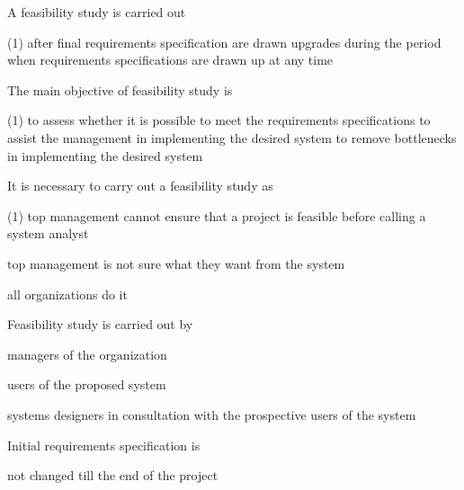 \documentclass{article}
\begin{document}
\begin{questions}
\begin{exercise}
        A feasibility study is carried out
        \begin{choice}(1)
            \choice after final requirements specification are drawn upgrades
            \choice during the period when requirements specifications are drawn up
            \choice {}
            \choice at any time
        \end{choice}
    \end{exercise}
    \begin{exercise}
        The main objective of feasibility study is
        \begin{choice}(1)
            \choice to assess whether it is possible to meet the requirements specifications
            \choice {}
            \choice to assist the management in implementing the desired system
            \choice to remove bottlenecks in implementing the desired system
        \end{choice}
    \end{exercise}
    \begin{exercise}
        It is necessary to carry out a feasibility study as
        \begin{choice}(1)
            \choice top management cannot ensure that a project is feasible before calling a system analyst

            \choice top management is not sure what they want from the system

            \choice {}

            \choice all organizations do it
        \end{choice}
    \end{exercise}
    \begin{exercise}
        Feasibility study is carried out by
        \begin{choice}
            \choice managers of the organization

            \choice {}

            \choice users of the proposed system

            \choice systems designers in consultation with the prospective users of the system
        \end{choice}
    \end{exercise}
    \begin{exercise}
        Initial requirements specification is
        \begin{choice}
            \choice not changed till the end of the project


\end{choice}
\end{exercise}
\end{questions}
\end{document}
